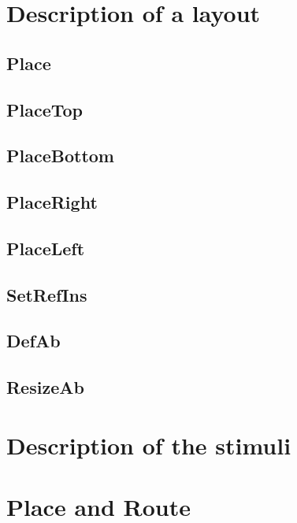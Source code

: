 \documentclass[11pt]{article}
\begin{document}
\section{Description of a layout}
\label{seclayout}

    \subsection{Place}
    \label{secplace}
    
    \subsection{PlaceTop}
    \label{sectop}
    
    \subsection{PlaceBottom}
    \label{secbottom}
    
    \subsection{PlaceRight}
    \label{secright}
    
    \subsection{PlaceLeft}
    \label{secleft}
    
    \subsection{SetRefIns}
    \label{secsetrefins}
    
    \subsection{DefAb}
    \label{secdefab}
    
    \subsection{ResizeAb}
    \label{secresizeab}
    
    
\section{Description of the stimuli}
\label{secstimuli}
    

\section{Place and Route}
\label{secroute}
\end{document}
